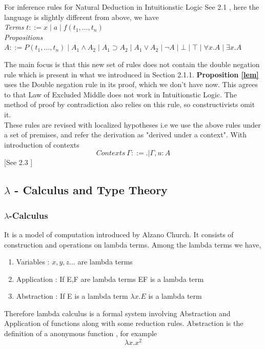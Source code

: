 \documentclass[12pt]{article}
\begin{document}
For inference rules for Natural Deduction in Intuitionstic Logic See 2.1 \cite{Pfenning2004}, here the language is slightly different from above, we have
\\
\textit{Terms} \quad $t ::= x \mid a \mid f(t_1, \ldots, t_n)$
\\
\textit{Propositions} \quad
$A ::= P(t_1, \ldots, t_n) \mid A_1 \land A_2 \mid A_1 \supset A_2 \mid A_1 \lor A_2 \mid \neg A \mid \bot \mid \top \mid \forall x. A \mid \exists x. A$

 The main focus is that this new set of rules does not contain the double negation rule which is present in what we introduced in Section 2.1.1. \textbf {Proposition \ref{lem}} uses the Double negation rule in its proof, which we don't have now. This agrees to that Law of Excluded Middle does not work in Intuitionstic Logic. The method of proof by contradiction also relies on this rule, so constructivists omit it.\\
These rules are revised with localized hypotheses i.e we use the above rules under a set of premises, and refer the derivation as "derived under a context". With introduction of contexts 
$$Contexts  \ \Gamma ::= .|\Gamma,u: A$$
[See 2.3 \cite{Pfenning2004}]


\subsection{$\lambda$ - Calculus and Type Theory} 

\subsubsection{ $\lambda$-Calculus}
It is a model of computation introduced by Alzano Church. It consists of construction and operations on lambda terms. 
Among the lambda terms we have,
\begin{enumerate}
    \item Variables : $x,y,z ...$ are lambda terms
    \item Application : If E,F are lambda terms EF is a lambda term 
    \item Abstraction : If E is a lambda term $\lambda x. E $ is a lambda term
\end{enumerate}
Therefore lambda calculus is a formal system involving Abstraction and Application of functions along with some reduction rules.
Abstraction is the definition of a anonymous function , for example \\
$$ \lambda x.x^2 $$
\end{document}

